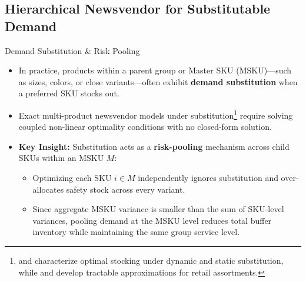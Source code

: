 \documentclass[11pt]{beamer}
\begin{document}
\subsection{Hierarchical Newsvendor for Substitutable Demand}
\begin{frame}{Demand Substitution \& Risk Pooling}
\begin{small}
\begin{itemize}
\item In practice, products within a parent group or Master SKU (MSKU)---such as sizes, colors, or close variants---often exhibit \textbf{demand substitution} when a preferred SKU stocks out.
\item Exact multi-product newsvendor models under substitution\footnote{\textcite{mahajan2001} and \textcite{netessine2003} characterize optimal stocking under dynamic and static substitution, while \textcite{rajaram2001} and \textcite{kok2007} develop tractable approximations for retail assortments.} require solving coupled non-linear optimality conditions with no closed-form solution.
\item \textbf{Key Insight:} Substitution acts as a \textbf{risk-pooling} mechanism across child SKUs within an MSKU $M$:
\begin{itemize}
\item Optimizing each SKU $i \in M$ independently ignores substitution and over-allocates safety stock across every variant.
\item Since aggregate MSKU variance is smaller than the sum of SKU-level variances, pooling demand at the MSKU level reduces total buffer inventory while maintaining the same group service level.
\end{itemize}
\end{itemize}
\end{small}
\end{frame}
\end{document}
